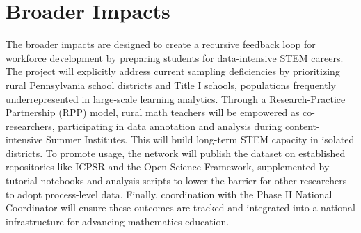 \documentclass[11pt]{article}
\begin{document}
\section*{Broader Impacts}
The broader impacts are designed to create a recursive feedback loop for workforce development by preparing students for data-intensive STEM careers. The project will explicitly address current sampling deficiencies by prioritizing rural Pennsylvania school districts and Title I schools, populations frequently underrepresented in large-scale learning analytics. Through a Research-Practice Partnership (RPP) model, rural math teachers will be empowered as co-researchers, participating in data annotation and analysis during content-intensive Summer Institutes. This will build long-term STEM capacity in isolated districts. To promote usage, the network will publish the dataset on established repositories like ICPSR and the Open Science Framework, supplemented by tutorial notebooks and analysis scripts to lower the barrier for other researchers to adopt process-level data. Finally, coordination with the Phase II National Coordinator will ensure these outcomes are tracked and integrated into a national infrastructure for advancing mathematics education.
\end{document}
